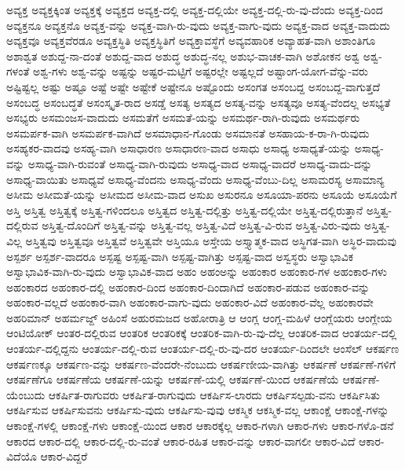{ಅವ್ಯಕ್ತ
ಅವ್ಯಕ್ತಕ್ಕಿಂತ
ಅವ್ಯಕ್ತಕ್ಕೆ
ಅವ್ಯಕ್ತದ
ಅವ್ಯಕ್ತ-ದಲ್ಲಿ
ಅವ್ಯಕ್ತ-ದಲ್ಲಿಯೇ
ಅವ್ಯಕ್ತ-ದಲ್ಲಿ-ರು-ವು-ದೆಂದು
ಅವ್ಯಕ್ತ-ದಿಂದ
ಅವ್ಯಕ್ತನೂ
ಅವ್ಯಕ್ತನೊ
ಅವ್ಯಕ್ತ-ವನ್ನು
ಅವ್ಯಕ್ತ-ವಾಗಿ-ರು-ವುದು
ಅವ್ಯಕ್ತ-ವಾಗು-ವುದು
ಅವ್ಯಕ್ತ-ವಾದ
ಅವ್ಯಕ್ತ-ವಾದುದು
ಅವ್ಯಕ್ತವೂ
ಅವ್ಯಕ್ತವೆರಡೂ
ಅವ್ಯಕ್ತಸ್ಥಿತಿ
ಅವ್ಯಕ್ತಸ್ಥಿತಿಗೆ
ಅವ್ಯಕ್ತಾವಸ್ಥೆಗೆ
ಅವ್ಯವಹಾರಿಕ
ಅವ್ಯಾಹತ-ವಾಗಿ
ಅಶಾಂತಿಗೂ
ಅಶಾಶ್ವತ
ಅಶುದ್ದ-ನಾ-ದಂತೆ
ಅಶುದ್ದ-ವಾದ
ಅಶುದ್ಧ
ಅಶುದ್ಧ-ನಲ್ಲ
ಅಶುಭ-ವಾಚಕ-ವಾಗಿ
ಅಶೋಕನ
ಅಶ್ವ
ಅಶ್ವ-ಗಳಂತೆ
ಅಶ್ವ-ಗಳು
ಅಶ್ವ-ವನ್ನು
ಅಷ್ಟನ್ನು
ಅಷ್ಟರ-ಮಟ್ಟಿಗೆ
ಅಷ್ಟರಲ್ಲೇ
ಅಷ್ಟಲ್ಲದೆ
ಅಷ್ಟಾಂಗ-ಯೋಗ-ವೆನ್ನು-ವರು
ಅಷ್ಟಿಷ್ಟಲ್ಲ
ಅಷ್ಟು
ಅಷ್ಟೂ
ಅಷ್ಟೆ
ಅಷ್ಟೇ
ಅಷ್ಟೇಕೆ
ಅಷ್ಟೇನೂ
ಅಷ್ಟೊಂದು
ಅಸಂಗತ
ಅಸಂಬದ್ದ
ಅಸಂಬದ್ದ-ವಾಗುತ್ತದೆ
ಅಸಂಬದ್ಧ
ಅಸಂಬದ್ಧತೆ
ಅಸಂಸ್ಕೃತ-ರಾದ
ಅಸಡ್ಡೆ
ಅಸತ್ಯ
ಅಸತ್ಯದ
ಅಸತ್ಯ-ವನ್ನು
ಅಸತ್ಯವೂ
ಅಸತ್ಯ-ವೆಂದಲ್ಲ
ಅಸಭ್ಯತೆ
ಅಸಭ್ಯರು
ಅಸಮಂಜಸ-ವಾದುದು
ಅಸಮತೆಗೆ
ಅಸಮತೆ-ಯನ್ನು
ಅಸಮರ್ಥ-ರಾಗಿ-ರುವುದು
ಅಸಮರ್ಥರು
ಅಸಮರ್ಪಕ-ವಾಗಿ
ಅಸಮರ್ಪಕ-ವಾಗಿದೆ
ಅಸಮಾಧಾನ-ಗೊಂಡು
ಅಸಮಾನತೆ
ಅಸಹಾಯ-ಕ-ರಾ-ಗಿ-ರುವುದು
ಅಸಹ್ಯಕರ-ವಾದವು
ಅಸಹ್ಯ-ವಾಗಿ
ಅಸಾಧಾರಣ
ಅಸಾಧಾರಣ-ವಾದ
ಅಸಾಧು
ಅಸಾಧ್ಯ
ಅಸಾಧ್ಯತೆ-ಯನ್ನು
ಅಸಾಧ್ಯ-ವನ್ನು
ಅಸಾಧ್ಯ-ವಾಗಿ-ರುವಂತೆ
ಅಸಾಧ್ಯ-ವಾಗಿ-ರುವುದು
ಅಸಾಧ್ಯ-ವಾದ
ಅಸಾಧ್ಯ-ವಾದರೆ
ಅಸಾಧ್ಯ-ವಾದು-ದನ್ನು
ಅಸಾಧ್ಯ-ವಾಯಿತು
ಅಸಾಧ್ಯವೆ
ಅಸಾಧ್ಯ-ವೆಂದನು
ಅಸಾಧ್ಯ-ವೆಂದು
ಅಸಾಧ್ಯ-ವೆಂಬು-ದಿಲ್ಲ
ಅಸಾಮರಸ್ಯ
ಅಸಾಮಾನ್ಯ
ಅಸೀಮ
ಅಸೀಮತೆ-ಯನ್ನು
ಅಸೀಮದ
ಅಸೀಮ-ವಾದ
ಅಸುಖ
ಅಸುರನೂ
ಅಸೂಯಾ-ಪರನು
ಅಸೂಯೆ
ಅಸೂಯೆಗೆ
ಅಸ್ತಿ
ಅಸ್ತಿತ್ವ
ಅಸ್ತಿತ್ವಕ್ಕೆ
ಅಸ್ತಿತ್ವ-ಗಳಿಂದಲೂ
ಅಸ್ತಿತ್ವದ
ಅಸ್ತಿತ್ವ-ದಲ್ಲಿತ್ತು
ಅಸ್ತಿತ್ವ-ದಲ್ಲಿಯೇ
ಅಸ್ತಿತ್ವ-ದಲ್ಲಿರುತ್ತಾನೆ
ಅಸ್ತಿತ್ವ-ದಲ್ಲಿರುವ
ಅಸ್ತಿತ್ವ-ದೊಂದಿಗೆ
ಅಸ್ತಿತ್ವ-ವನ್ನು
ಅಸ್ತಿತ್ವ-ವಲ್ಲ
ಅಸ್ತಿತ್ವ-ವಿದೆ
ಅಸ್ತಿತ್ವ-ವಿ-ರುವ
ಅಸ್ತಿತ್ವ-ವಿರು-ವುದು
ಅಸ್ತಿತ್ವ-ವಿಲ್ಲ
ಅಸ್ತಿತ್ವವು
ಅಸ್ತಿತ್ವವೂ
ಅಸ್ತಿತ್ವವೆ
ಅಸ್ತಿತ್ವವೇ
ಅಸ್ತಿಯೂ
ಅಸ್ತೇಯ
ಅಸ್ತ್ಯಾತ್ಮಕ-ವಾದ
ಅಸ್ಥಿಗತ-ವಾಗಿ
ಅಸ್ಥಿರ-ವಾದುವು
ಅಸ್ಪರ್ಶ
ಅಸ್ಪರ್ಶ-ವಾದರೂ
ಅಸ್ಪಷ್ಟ
ಅಸ್ಪಷ್ಟ-ವಾಗಿ
ಅಸ್ಪಷ್ಟ-ವಾಗಿತ್ತು
ಅಸ್ಪಷ್ಟ-ವಾದ
ಅಸ್ವಸ್ಥರು
ಅಸ್ವಾಭಾವಿಕ
ಅಸ್ವಾಭಾವಿಕ-ವಾಗಿ-ರು-ವುದು
ಅಸ್ವಾಭಾವಿಕ-ವಾದ
ಅಹಂ
ಅಹಂಅನ್ನು
ಅಹಂಕಾರ
ಅಹಂಕಾರ-ಗಳ
ಅಹಂಕಾರ-ಗಳು
ಅಹಂಕಾರದ
ಅಹಂಕಾರ-ದಲ್ಲಿ
ಅಹಂಕಾರ-ದಿಂದ
ಅಹಂಕಾರ-ದಿಂದಾಗಿದೆ
ಅಹಂಕಾರ-ಪಡುವ
ಅಹಂಕಾರ-ವನ್ನು
ಅಹಂಕಾರ-ವಲ್ಲದೆ
ಅಹಂಕಾರ-ವಾಗಿ
ಅಹಂಕಾರ-ವಾಗು-ವುದು
ಅಹಂಕಾರ-ವಿದೆ
ಅಹಂಕಾರ-ವೆಲ್ಲ
ಅಹಂಕಾರವೇ
ಅಹರಿಮಾನ್
ಅಹರ್ಮಜ್ದ್
ಅಹಿಂಸೆ
ಅಹುರಮಜದ
ಅಹೋರಾತ್ರಿ
ಆ
ಆಂಗ್ಲ
ಆಂಗ್ಲ-ಮಹಿಳೆ
ಆಂಗ್ಲೆಯರು
ಆಂಗ್ಲೇಯ
ಆಂಟಿಯೋಕ್
ಆಂತರ-ದಲ್ಲಿರುವ
ಆಂತರಿಕ
ಆಂತರಿಕಕ್ಕೆ
ಆಂತರಿಕ-ವಾಗಿ-ರು-ವು-ದೆಲ್ಲ
ಆಂತರಿಕ-ವಾದ
ಆಂತರ್ಯ-ದಲ್ಲಿ
ಆಂತರ್ಯ-ದಲ್ಲಿದ್ದನು
ಆಂತರ್ಯ-ದಲ್ಲಿ-ರುವ
ಆಂತರ್ಯ-ದಲ್ಲಿ-ರು-ವು-ದರ
ಆಂತರ್ಯ-ದಿಂದಲೇ
ಆಂಸೆಲ್
ಆಕರ್ಷಣ
ಆಕರ್ಷಣಕ್ಕೂ
ಆಕರ್ಷಣ-ವನ್ನು
ಆಕರ್ಷಣ-ವೆಂದರೇ-ನೆಂಬುದು
ಆಕರ್ಷಣೀಯ-ವಾಗಿತ್ತು
ಆಕರ್ಷಣೆ
ಆಕರ್ಷಣೆ-ಗಳಿಗೆ
ಆಕರ್ಷಣೆಗೂ
ಆಕರ್ಷಣೆಯ
ಆಕರ್ಷಣೆ-ಯನ್ನು
ಆಕರ್ಷಣೆ-ಯಲ್ಲಿ
ಆಕರ್ಷಣೆ-ಯಿಂದ
ಆಕರ್ಷಣೆಯೆ
ಆಕರ್ಷಣೆ-ಯೆಂಬುದು
ಆಕರ್ಷಿತ-ರಾಗುವರು
ಆಕರ್ಷಿತ-ರಾಗುವುದು
ಆಕರ್ಷಿಸ-ಲಾರದು
ಆಕರ್ಷಿಸಲ್ಪಡು-ವನು
ಆಕರ್ಷಿಸಿತು
ಆಕರ್ಷಿಸುವ
ಆಕರ್ಷಿಸುವನು
ಆಕರ್ಷಿಸು-ವುದು
ಆಕರ್ಷಿಸು-ವುವು
ಆಕಸ್ಮಿಕ
ಆಕಸ್ಮಿಕ-ವಲ್ಲ
ಆಕಾಂಕ್ಷೆ
ಆಕಾಂಕ್ಷೆ-ಗಳನ್ನು
ಆಕಾಂಕ್ಷೆ-ಗಳಲ್ಲಿ
ಆಕಾಂಕ್ಷೆ-ಗಳು
ಆಕಾಂಕ್ಷೆ-ಯಿಂದ
ಆಕಾರ
ಆಕಾರಕ್ಕೆಲ್ಲ
ಆಕಾರ-ಗಳಾಗಿ
ಆಕಾರ-ಗಳು
ಆಕಾರ-ಗಳೊ-ಡನೆ
ಆಕಾರದ
ಆಕಾರ-ದಲ್ಲಿ
ಆಕಾರ-ದಲ್ಲಿ-ರು-ವಂತೆ
ಆಕಾರ-ರಹಿತ
ಆಕಾರ-ವನ್ನು
ಆಕಾರ-ವಾಗಲೀ
ಆಕಾರ-ವಿದೆ
ಆಕಾರ-ವಿದೆಯೊ
ಆಕಾರ-ವಿದ್ದರೆ
}
